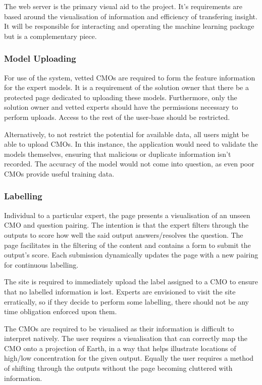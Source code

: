 \documentclass{ecmm427_assignment}
\begin{document}
The web server is the primary visual aid to the project. It's requirements are based around the visualisation of information and efficiency of transfering insight. It will be responsible for interacting and operating the machine learning package but is a complementary piece.

\subsubsection{Model Uploading}

 For use of the system, vetted CMOs are required to form the feature information for the expert models. It is a requirement of the solution owner that there be a protected page dedicated to uploading these models. Furthermore, only the solution owner and vetted experts should have the permissions necessary to perform uploads. Access to the rest of the user-base should be restricted.

  Alternatively, to not restrict the potential for available data, all users might be able to upload CMOs. In this instance, the application would need to validate the models themselves, ensuring that malicious or duplicate information isn't recorded. The accuracy of the model would not come into question, as even poor CMOs provide useful training data.

\subsubsection{Labelling}

 Individual to a particular expert, the page presents a visualisation of an unseen CMO and question pairing. The intention is that the expert filters through the outputs to score how well the said output answers/resolves the question. The page facilitates in the filtering of the content and contains a form to submit the output's score. Each submission dynamically updates the page with a new pairing for continuous labelling.

 The site is required to immediately upload the label assigned to a CMO to ensure that no labelled information is lost. Experts are envisioned to visit the site erratically, so if they decide to perform some labelling, there should not be any time obligation enforced upon them.

 The CMOs are required to be visualised as their information is difficult to interpret natively. The user requires a visualisation that can correctly map the CMO onto a projection of Earth, in a way that helps illustrate locations of high/low concentration for the given output. Equally the user requires a method of shifting through the outputs without the page becoming cluttered with information.
\end{document}
